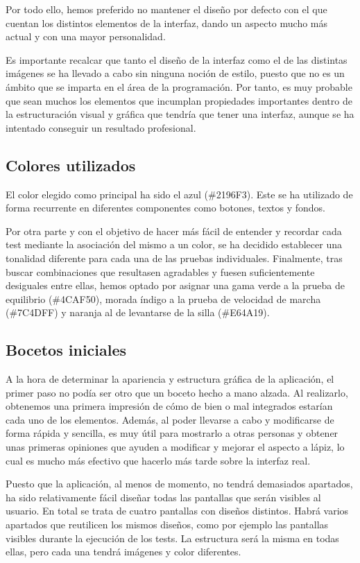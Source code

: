 Por todo ello, hemos preferido no mantener el diseño por defecto con el que cuentan los distintos elementos de la interfaz, dando un aspecto mucho más actual y con una mayor personalidad.

Es importante recalcar que tanto el diseño de la interfaz como el de las distintas imágenes se ha llevado a cabo sin ninguna noción de estilo, puesto que no es un ámbito que se imparta en el área de la programación. Por tanto, es muy probable que sean muchos los elementos que incumplan propiedades importantes dentro de la estructuración visual y gráfica que tendría que tener una interfaz, aunque se ha intentado conseguir un resultado profesional.


\subsection{Colores utilizados}

El color elegido como principal ha sido el azul (\#2196F3). Este se ha utilizado de forma recurrente en diferentes componentes como botones, textos y fondos. 

Por otra parte y con el objetivo de hacer más fácil de entender y recordar cada test mediante la asociación del mismo a un color, se ha decidido establecer una tonalidad diferente para cada una de las pruebas individuales. Finalmente, tras buscar combinaciones que resultasen agradables y fuesen suficientemente desiguales entre ellas, hemos optado por asignar una gama verde a la prueba de equilibrio (\#4CAF50), morada índigo a la prueba de velocidad de marcha (\#7C4DFF) y naranja al de levantarse de la silla (\#E64A19).

\subsection{Bocetos iniciales}

A la hora de determinar la apariencia y estructura gráfica de la aplicación, el primer paso no podía ser otro que un boceto hecho a mano alzada. Al realizarlo, obtenemos una primera impresión de cómo de bien o mal integrados estarían cada uno de los elementos. Además, al poder llevarse a cabo y modificarse de forma rápida y sencilla, es muy útil para mostrarlo a otras personas y obtener unas primeras opiniones que ayuden a modificar y mejorar el aspecto a lápiz, lo cual es mucho más efectivo que hacerlo más tarde sobre la interfaz real.

Puesto que la aplicación, al menos de momento, no tendrá demasiados apartados, ha sido relativamente fácil diseñar todas las pantallas que serán visibles al usuario. En total se trata de cuatro pantallas con diseños distintos. Habrá varios apartados que reutilicen los mismos diseños, como por ejemplo las pantallas visibles durante la ejecución de los tests. La estructura será la misma en todas ellas, pero cada una tendrá imágenes y color diferentes.

